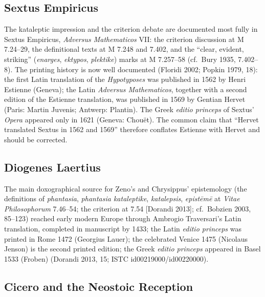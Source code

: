 \documentclass[11pt]{article}
\theoremstyle{plain}
\theoremstyle{definition}
\theoremstyle{remark}
\begin{document}
\subsection{Sextus Empiricus}

The kataleptic impression and the criterion debate are documented most
fully in Sextus Empiricus, \emph{Adversus Mathematicos} VII: the
criterion discussion at M 7.24--29, the definitional texts at M 7.248
and 7.402, and the ``clear, evident, striking''
(\emph{enarges}, \emph{ektypos}, \emph{plektike}) marks at M 7.257--58
(cf.\ Bury 1935, 7.402--8). The printing history is now well documented
(Floridi 2002; Popkin 1979, 18): the first Latin translation of the
\emph{Hypotyposes} was published in 1562 by Henri Estienne (Geneva);
the Latin \emph{Adversus Mathematicos}, together with a second edition
of the Estienne translation, was published in 1569 by Gentian Hervet
(Paris: Martin Juvenis; Antwerp: Plantin). The Greek \emph{editio
princeps} of Sextus' \emph{Opera} appeared only in 1621 (Geneva:
Chou\"et). The common claim that ``Hervet translated Sextus in 1562 and
1569'' therefore conflates Estienne with Hervet and should be
corrected.

\subsection{Diogenes Laertius}

The main doxographical source for Zeno's and Chrysippus' epistemology
(the definitions of \emph{phantasia}, \emph{phantasia kataleptike},
\emph{katalepsis}, \emph{epist\=em\=e} at \emph{Vitae Philosophorum}
7.46--54; the criterion at 7.54 [Dorandi 2013]; cf.\ Bobzien 2003,
85--123) reached early modern Europe through Ambrogio Traversari's
Latin translation, completed in manuscript by 1433; the Latin
\emph{editio princeps} was printed in Rome 1472 (Georgius Lauer); the
celebrated Venice 1475 (Nicolaus Jenson) is the second printed edition;
the Greek \emph{editio princeps} appeared in Basel 1533 (Froben)
(Dorandi 2013, 15; ISTC id00219000/id00220000).

\subsection{Cicero and the Neostoic Reception}
\end{document}
